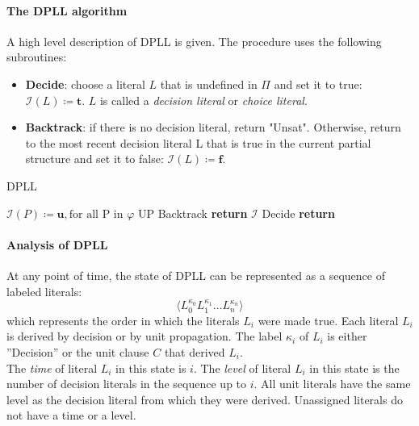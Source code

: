 \documentclass[10pt,a4paper]{article}
\theoremstyle{definition}
\begin{document}
\paragraph{The DPLL algorithm} A high level description of DPLL is given. The procedure uses the following subroutines:

\begin{itemize}
	\item \textbf{Decide}: choose a literal $L$ that is undefined in $\Pi$ and set it to true: $\mathcal{I}(L) \coloneqq \textbf{t}$. $L$ is called a \textit{decision literal} or \textit{choice literal}.
	\item \textbf{Backtrack}: if there is no decision literal, return "Unsat". Otherwise, return to the most recent decision literal L that is true in the current partial structure and set it to false: $\mathcal{I}(L) \coloneqq \textbf{f}$.
\end{itemize}

\begin{algorithm}
\caption{DPLL}
\begin{algorithmic}[1]
	\State $\mathcal{I}(P) \coloneqq \textbf{u}, \text{for all P in } \varphi$ 
        \State UP
        \State Backtrack
        \State \textbf{return} $\mathcal{I}$
        \Else 
        \State Decide
        \EndIf
    \EndWhile
    \State \textbf{return}
\EndProcedure
\end{algorithmic}
\end{algorithm}

\paragraph{Analysis of DPLL} At any point of time, the state of DPLL can be represented as a sequence of labeled literals: $$\langle L_0^{\kappa_0} L_1^{\kappa_1} \dots L_n^{\kappa_n} \rangle$$
which represents the order in which the literals $L_i$ were made true. Each literal $L_i$  is derived by
decision or by unit propagation. The label $\kappa_i$  of $L_i$ 
is either ”Decision” or the unit clause $C$ that derived $L_i$. \\

The \textit{time} of literal $L_i$ in this state is $i$. The \textit{level} of literal $L_i$ in this state is the number of decision literals in the sequence up to $i$. All unit literals have the same level as the decision literal from which they were derived. Unassigned literals do not have a time or a level.\\
\end{document}
